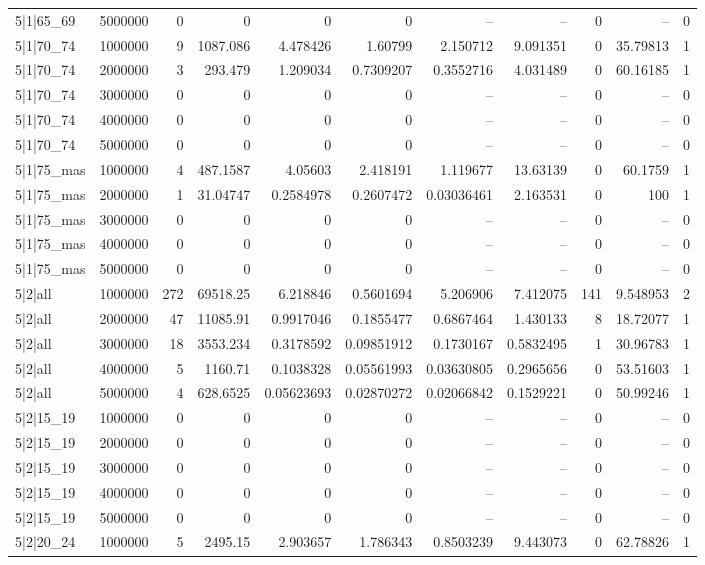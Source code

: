 \begin{tabular}{lrrrrrrrrrr}
5|1|65\_69 & 5000000 & 0 & 0 & 0 & 0 & -- & -- & 0 & -- & 0 \\
5|1|70\_74 & 1000000 & 9 & 1087.086 & 4.478426 & 1.60799 & 2.150712 & 9.091351 & 0 & 35.79813 & 1 \\
5|1|70\_74 & 2000000 & 3 & 293.479 & 1.209034 & 0.7309207 & 0.3552716 & 4.031489 & 0 & 60.16185 & 1 \\
5|1|70\_74 & 3000000 & 0 & 0 & 0 & 0 & -- & -- & 0 & -- & 0 \\
5|1|70\_74 & 4000000 & 0 & 0 & 0 & 0 & -- & -- & 0 & -- & 0 \\
5|1|70\_74 & 5000000 & 0 & 0 & 0 & 0 & -- & -- & 0 & -- & 0 \\
5|1|75\_mas & 1000000 & 4 & 487.1587 & 4.05603 & 2.418191 & 1.119677 & 13.63139 & 0 & 60.1759 & 1 \\
5|1|75\_mas & 2000000 & 1 & 31.04747 & 0.2584978 & 0.2607472 & 0.03036461 & 2.163531 & 0 & 100 & 1 \\
5|1|75\_mas & 3000000 & 0 & 0 & 0 & 0 & -- & -- & 0 & -- & 0 \\
5|1|75\_mas & 4000000 & 0 & 0 & 0 & 0 & -- & -- & 0 & -- & 0 \\
5|1|75\_mas & 5000000 & 0 & 0 & 0 & 0 & -- & -- & 0 & -- & 0 \\
5|2|all & 1000000 & 272 & 69518.25 & 6.218846 & 0.5601694 & 5.206906 & 7.412075 & 141 & 9.548953 & 2 \\
5|2|all & 2000000 & 47 & 11085.91 & 0.9917046 & 0.1855477 & 0.6867464 & 1.430133 & 8 & 18.72077 & 1 \\
5|2|all & 3000000 & 18 & 3553.234 & 0.3178592 & 0.09851912 & 0.1730167 & 0.5832495 & 1 & 30.96783 & 1 \\
5|2|all & 4000000 & 5 & 1160.71 & 0.1038328 & 0.05561993 & 0.03630805 & 0.2965656 & 0 & 53.51603 & 1 \\
5|2|all & 5000000 & 4 & 628.6525 & 0.05623693 & 0.02870272 & 0.02066842 & 0.1529221 & 0 & 50.99246 & 1 \\
5|2|15\_19 & 1000000 & 0 & 0 & 0 & 0 & -- & -- & 0 & -- & 0 \\
5|2|15\_19 & 2000000 & 0 & 0 & 0 & 0 & -- & -- & 0 & -- & 0 \\
5|2|15\_19 & 3000000 & 0 & 0 & 0 & 0 & -- & -- & 0 & -- & 0 \\
5|2|15\_19 & 4000000 & 0 & 0 & 0 & 0 & -- & -- & 0 & -- & 0 \\
5|2|15\_19 & 5000000 & 0 & 0 & 0 & 0 & -- & -- & 0 & -- & 0 \\
5|2|20\_24 & 1000000 & 5 & 2495.15 & 2.903657 & 1.786343 & 0.8503239 & 9.443073 & 0 & 62.78826 & 1 \\

\end{tabular}
